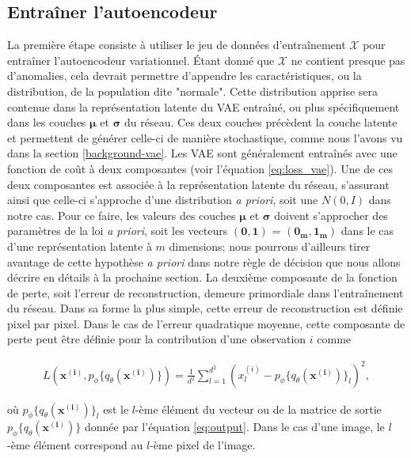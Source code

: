 \subsection{Entraîner l'autoencodeur} \label{meth:train-vae}

La première étape consiste à utiliser le jeu de données d'entraînement $\mathcal{X}$ pour entraîner l'autoencodeur variationnel. Étant donné que $\mathcal{X}$ ne contient presque pas d'anomalies, cela devrait permettre d'appendre les caractéristiques, ou la distribution, de la population dite "normale". Cette distribution apprise sera contenue dans la représentation latente du VAE entraîné, ou plus spécifiquement dans les couches $\boldsymbol{\mu}$ et $\boldsymbol{\sigma}$ du réseau. Ces deux couches précèdent la couche latente et permettent de générer celle-ci de manière stochastique, comme nous l'avons vu dans la section \ref{background-vae}. Les VAE sont généralement entraînés avec une fonction de coût à deux composantes (voir l'équation \ref{eq:loss_vae}). Une de ces deux composantes est associée à la représentation latente du réseau, s'assurant ainsi que celle-ci s'approche d'une distribution \textit{a priori}, soit une $N(0, I)$ dans notre cas. Pour ce faire, les valeurs des couches $\boldsymbol{\mu}$ et $\boldsymbol{\sigma}$ doivent s'approcher des paramètres de la loi \textit{a priori}, soit les vecteurs $(\mathbf{0}, \mathbf{1})$ = $(\boldsymbol{0_m}, \boldsymbol{1_m})$ dans le cas d'une représentation latente à $m$ dimensions; nous pourrons d'ailleurs tirer avantage de cette hypothèse \textit{a priori} dans notre règle de décision que nous allons décrire en détails à la prochaine section. La deuxième composante de la fonction de perte, soit l'erreur de reconstruction, demeure primordiale dans l'entraînement du réseau. Dans sa forme la plus simple, cette erreur de reconstruction est définie pixel par pixel. Dans le cas de l'erreur quadratique moyenne, cette composante de perte peut être définie pour la contribution d'une observation $i$ comme

\begin{gather} \label{eq:mse_loss}
L(\boldsymbol{x^{(i)}}, p_\phi\{q_\theta(\boldsymbol{x^{(i)}})\}) = \frac{1}{d^2} \sum_{l=1}^{d^2} (x^{(i)}_{l} - p_\phi\{q_\theta(\boldsymbol{x^{(i)}})\}_l)^2,
\end{gather}

où $p_\phi\{q_\theta(\boldsymbol{x^{(i)}})\}_l$ est le $l$-ème élément du vecteur ou de la matrice de sortie $p_\phi\{q_\theta(\boldsymbol{x^{(i)}})\}$ donnée par l'équation \ref{eq:output}. Dans le cas d'une image, le $l$-ème élément correspond au $l$-ème  pixel de l'image.

